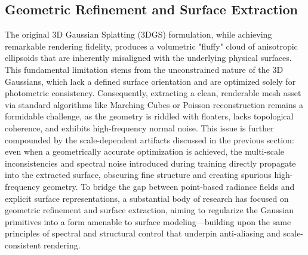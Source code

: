 \documentclass[11pt,a4paper]{article}
\begin{document}
\subsection{Geometric Refinement and Surface Extraction}


The original 3D Gaussian Splatting (3DGS) formulation, while achieving remarkable rendering fidelity, produces a volumetric "fluffy" cloud of anisotropic ellipsoids that are inherently misaligned with the underlying physical surfaces. This fundamental limitation stems from the unconstrained nature of the 3D Gaussians, which lack a defined surface orientation and are optimized solely for photometric consistency. Consequently, extracting a clean, renderable mesh asset via standard algorithms like Marching Cubes or Poisson reconstruction remains a formidable challenge, as the geometry is riddled with floaters, lacks topological coherence, and exhibits high-frequency normal noise. This issue is further compounded by the scale-dependent artifacts discussed in the previous section: even when a geometrically accurate optimization is achieved, the multi-scale inconsistencies and spectral noise introduced during training directly propagate into the extracted surface, obscuring fine structure and creating spurious high-frequency geometry. To bridge the gap between point-based radiance fields and explicit surface representations, a substantial body of research has focused on geometric refinement and surface extraction, aiming to regularize the Gaussian primitives into a form amenable to surface modeling---building upon the same principles of spectral and structural control that underpin anti-aliasing and scale-consistent rendering.
\end{document}

